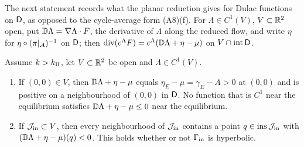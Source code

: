 The next statement records what the planar reduction gives for Dulac functions on $\mathsf D$, as opposed to the cycle-average form (A8)(f). For $\Lambda\in C^1(V)$, $V\subset\mathbb R^2$ open, put $\mathbb D\Lambda=\nabla\Lambda\cdot F$, the derivative of $\Lambda$ along the reduced flow, and write $\eta$ for $\eta\circ(\pi|_\mathcal A)^{-1}$ on $\mathsf D$; then $\operatorname{div}(e^{\Lambda}F)=e^{\Lambda}(\mathbb D\Lambda+\eta-\mu)$ on $V\cap\operatorname{int}\mathsf D$.

\begin{corollary}\label{att:cor:dulac}
Assume $k>k_{\mathrm H}$, let $V\subset\mathbb R^2$ be open and $\Lambda\in C^1(V)$.
\begin{enumerate}[label=\textup{(\roman*)}]
\item If $(0,0)\in V$, then $\mathbb D\Lambda+\eta-\mu$ equals $\eta_E-\mu=\gamma_E-A>0$ at $(0,0)$ and is positive on a neighbourhood of $(0,0)$ in $\mathsf D$. No function that is $C^1$ near the equilibrium satisfies $\mathbb D\Lambda+\eta-\mu\le0$ near the equilibrium.
\item If $\mathcal J_{\rm in}\subset V$, then every neighbourhood of $\mathcal J_{\rm in}$ contains a point $q\in\operatorname{ins}\mathcal J_{\rm in}$ with $(\mathbb D\Lambda+\eta-\mu)(q)<0$. This holds whether or not $\Gamma_{\rm in}$ is hyperbolic.
\end{enumerate}
\end{corollary}
